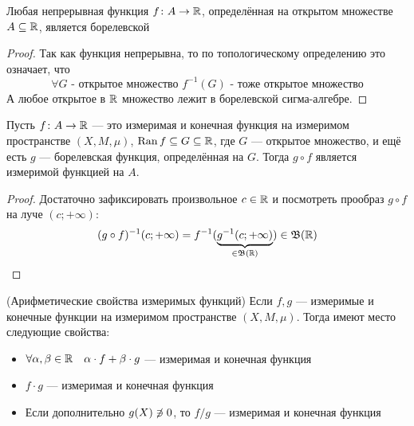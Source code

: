 \begin{proposition}
	Любая непрерывная функция $f \colon A \to \mathbb{R}$, определённая на открытом множестве $A \subseteq \mathbb{R}$, является борелевской
\end{proposition}

\begin{proof}
	Так как функция непрерывна, то по топологическому определению это означает, что
	\[
		\forall G \text{ - открытое множество } f^{-1}(G) \text{ - тоже открытое множество}
	\]
	А любое открытое в $\mathbb{R}$ множество лежит в борелевской сигма-алгебре.
\end{proof}

\begin{theorem}
	Пусть $f \colon A \to \mathbb{R}$ --- это измеримая и конечная функция на измеримом пространстве $(X, M, \mu)$, $\operatorname{Ran} f \subseteq G \subseteq \mathbb{R}$, где $G$ --- открытое множество, и ещё есть $g$ --- борелевская функция, определённая на $G$. Тогда $g \circ f$ является измеримой функцией на $A$.
\end{theorem}

\begin{proof}
	Достаточно зафиксировать произвольное $c \in \mathbb{R}$ и посмотреть прообраз $g \circ f$ на луче $(c; +\infty)$:
	\[
		(g \circ f)^{-1}(c; +\infty) = f^{-1}(\underbrace{g^{-1}(c; +\infty)}_{\in \mathfrak{B}(\mathbb{R})}) \in \mathfrak{B}(\mathbb{R})
	\]
\end{proof}

\begin{theorem} (Арифметические свойства измеримых функций)
	Если $f, g$ --- измеримые и конечные функции на измеримом пространстве $(X, M, \mu)$. Тогда имеют место следующие свойства:
	\begin{itemize}
		\item $\forall \alpha, \beta \in \mathbb{R} \quad \alpha \cdot f + \beta \cdot g$ --- измеримая и конечная функция
		
		\item $f \cdot g$ --- измеримая и конечная функция
		
		\item Если дополнительно $g(X) \centernot\ni 0$, то $f / g$ --- измеримая и конечная функция
	\end{itemize}
\end{theorem}

